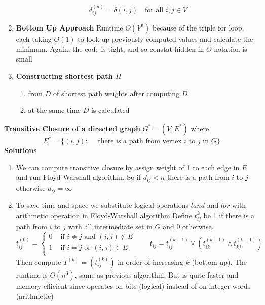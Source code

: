 \documentclass[11pt]{article}
\begin{document}
\begin{defn*}
\begin{enumerate}
        \[
            d_{ij}^{(n)} = \delta(i,j) \quad \text{for all } i,j\in V
        \]
        \item \textbf{Bottom Up Approach} Runtime $O(V^3)$ because of the triple for loop, each taking $O(1)$ to look up previously computed values and calculate the minimum. Again, the code is tight, and so constat hidden in $\Theta$ notation is small
        \item \textbf{Constructing shortest path $\Pi$}
        \begin{enumerate}
            \item from $D$ of shortest path weights after computing $D$
            \item at the same time $D$ is calculated 
        \end{enumerate} 
    \end{enumerate}
    
\end{defn*}


\begin{defn*}
    \textbf{Transitive Closure of a directed graph} $G^* = (V, E^*)$ where 
    \[
        E^* = \{(i,j):\quad \text{ there is a path from vertex $i$ to $j$ in $G$} \}
    \]
    \textbf{Solutions}
    \begin{enumerate}
        \item We can compute transitive closure by assign weight of 1 to each edge in $E$ and run Floyd-Warshall algorithm. So if $d_{ij} < n$ there is a path from $i$ to $j$ otherwise $d_{ij} = \infty$
        \item To save time and space we substitute logical operations $land$ and $lor$ with arithmetic operation in Floyd-Warshall algorithm Define $t_{ij}^k$ be 1 if there is a path from $i$ to $j$ with all intermediate set in $G$ and 0 otherwise. 
        \[
            t_{ij}^{(0)} = 
            \begin{cases}
                0 & \text{ if $i\neq j$ and } (i,j)\not\in E \\
                1 & \text{ if $i = j$ or } (i,j)\in E\\
            \end{cases}
            \quad\quad 
            t_{ij} = t_{ij}^{(k-1)} \lor ( t_{ik}^{(k-1)} \land t_{kj}^{(k-1)})
        \]
        Then compute $T^{(k)} = (t_{ij}^{(k)})$ in order of increasing $k$ (bottom up). The runtime is $\Theta(n^3)$, same as previous algorithm. But is quite faster and memory efficient since operates on bits (logical) instead of on integer words (arithmetic)  
    \end{enumerate}
\end{defn*}
\end{document}
